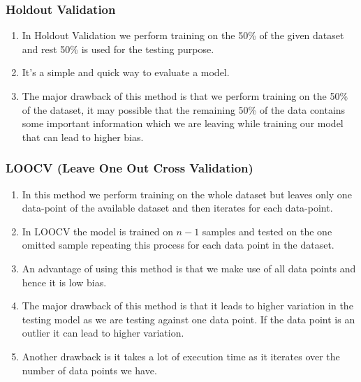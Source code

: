 \subsubsection{Holdout Validation}

\begin{enumerate}
    \item In Holdout Validation we perform training on the 50\% of the given dataset and rest 50\% is used for the testing purpose.
    \hfill \cite{geeksforgeeks/machine-learning/cross-validation-machine-learning}

    \item It's a simple and quick way to evaluate a model.
    \hfill \cite{geeksforgeeks/machine-learning/cross-validation-machine-learning}

    \item The major drawback of this method is that we perform training on the 50\% of the dataset, it may possible that the remaining 50\% of the data contains some important information which we are leaving while training our model that can lead to higher bias.
    \hfill \cite{geeksforgeeks/machine-learning/cross-validation-machine-learning}
\end{enumerate}



\subsubsection{LOOCV (Leave One Out Cross Validation)}

\begin{enumerate}
    \item In this method we perform training on the whole dataset but leaves only one data-point of the available dataset and then iterates for each data-point.
    \hfill \cite{geeksforgeeks/machine-learning/cross-validation-machine-learning}

    \item In LOOCV the model is trained on $n-1$ samples and tested on the one omitted sample repeating this process for each data point in the dataset.
    \hfill \cite{geeksforgeeks/machine-learning/cross-validation-machine-learning}

    \item An advantage of using this method is that we make use of all data points and hence it is low bias.
    \hfill \cite{geeksforgeeks/machine-learning/cross-validation-machine-learning}

    \item The major drawback of this method is that it leads to higher variation in the testing model as we are testing against one data point. If the data point is an outlier it can lead to higher variation.
    \hfill \cite{geeksforgeeks/machine-learning/cross-validation-machine-learning}

    \item Another drawback is it takes a lot of execution time as it iterates over the number of data points we have.
    \hfill \cite{geeksforgeeks/machine-learning/cross-validation-machine-learning}
\end{enumerate}






